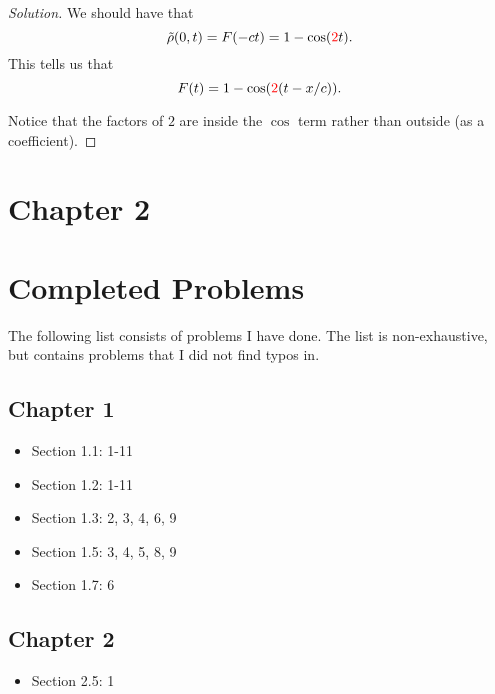 \documentclass[11pt]{article}
\newenvironment{solution}
  {\renewcommand\qedsymbol{$\blacksquare$}\begin{proof}[Solution]}
  {\end{proof}}
\begin{document}
\begin{solution}
We should have that \[\tilde{\rho}(0,t) = F(-ct) = 1- \cos(\textcolor{red}{2}t).\] This tells us that \[F(t) = 1-\cos(\textcolor{red}{2}(t - x/c)). \]

Notice that the factors of $2$ are inside the $\cos$ term rather than outside (as a coefficient).
\end{solution}

\section{Chapter 2}

\appendix

\newpage

\section{Completed Problems}

The following list consists of problems I have done. The list is non-exhaustive, but contains problems that I did not find typos in.
\subsection{Chapter 1}
\begin{itemize}
  \item Section 1.1: 1-11
  \item Section 1.2: 1-11
  \item Section 1.3: 2, 3, 4, 6, 9
  \item Section 1.5: 3, 4, 5, 8, 9
  \item Section 1.7: 6
\end{itemize}

\subsection{Chapter 2}
\begin{itemize}
  \item Section 2.5: 1
\end{itemize}
\end{document}
